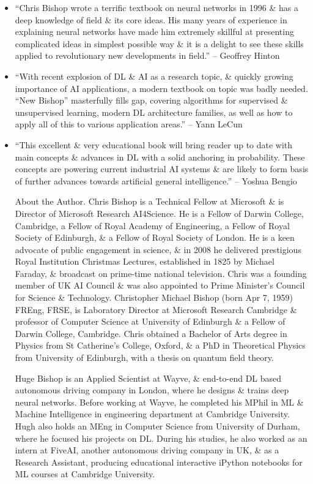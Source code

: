 \documentclass{article}
\begin{document}
\begin{itemize}
	\item ``{\sc Chris Bishop} wrote a terrific textbook on neural networks in 1996 \& has a deep knowledge of field \& its core ideas. His many years of experience in explaining neural networks have made him extremely skillful at presenting complicated ideas in simplest possible way \& it is a delight to see these skills applied to revolutionary new developments in field.'' -- {\sc Geoffrey Hinton}
	\item ``With recent explosion of DL \& AI as a research topic, \& quickly growing importance of AI applications, a modern textbook on topic was badly needed. ``New Bishop'' masterfully fills gap, covering algorithms for supervised \& unsupervised learning, modern DL architecture families, as well as how to apply all of this to various application areas.'' -- {\sc Yann LeCun}
	\item ``This excellent \& very educational book will bring reader up to date with main concepts \& advances in DL with a solid anchoring in probability. These concepts are powering current industrial AI systems \& are likely to form basis of further advances towards artificial general intelligence.'' -- {\sc Yoshua Bengio}

	{\sf About the Author.} {\sc Chris Bishop} is a Technical Fellow at Microsoft \& is Director of Microsoft Research AI4Science. He is a Fellow of Darwin College, Cambridge, a Fellow of Royal Academy of Engineering, a Fellow of Royal Society of Edinburgh, \& a Fellow of Royal Society of London. He is a keen advocate of public engagement in science, \& in 2008 he delivered prestigious Royal Institution Christmas Lectures, established in 1825 by {\sc Michael Faraday}, \& broadcast on prime-time national television. {\sc Chris} was a founding member of UK AI Council \& was also appointed to Prime Minister's Council for Science \& Technology. {\sc Christopher Michael Bishop} (born Apr 7, 1959) FREng, FRSE, is Laboratory Director at Microsoft Research Cambridge \& professor of Computer Science at University of Edinburgh \& a Fellow of Darwin College, Cambridge. {\sc Chris} obtained a Bachelor of Arts degree in Physics from St Catherine's College, Oxford, \& a PhD in Theoretical Physics from University of Edinburgh, with a thesis on quantum field theory.

	{\sc Huge Bishop} is an Applied Scientist at Wayve, \& end-to-end DL based autonomous driving company in London, where he designs \& trains deep neural networks. Before working at Wayve, he completed his MPhil in ML \& Machine Intelligence in engineering department at Cambridge University. {\sc Hugh} also holds an MEng in Computer Science from University of Durham, where he focused his projects on DL. During his studies, he also worked as an intern at FiveAI, another autonomous driving company in UK, \& as a Research Assistant, producing educational interactive iPython notebooks for ML courses at Cambridge University.
\end{itemize}
\end{document}
